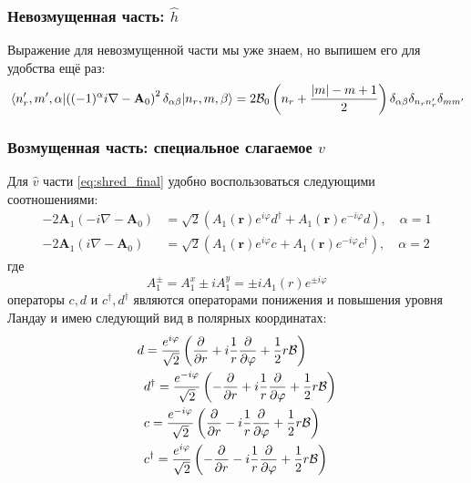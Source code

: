 \documentclass[a4paper,article,14pt]{extarticle}
\begin{document}
\subsubsection{Невозмущенная часть: $\hat h$}
Выражение для невозмущенной части мы уже знаем, но выпишем его для удобства ещё раз:
\begin{equation}
\mel{n'_r, m', \alpha} {\left((-1)^\alpha i \nabla - \mathbf{A}_0 \right) ^ 2 \delta_{\alpha \beta}} {n_r, m, \beta} = 
2 {\cal B}_{0} \left( n_r + \frac{|m| - m + 1}{2} \right) \delta_{\alpha \beta} \delta_{n_r n'_r} \delta_{m m'} 
\end{equation}


\subsubsection{Возмущенная часть: специальное слагаемое $\hat v$}
Для  $\hat v$ части \eqref{eq:shred_final} удобно воспользоваться следующими соотношениями:
\begin{equation}
\begin{aligned}
-2 \mathbf{A}_1  (-i \nabla - \mathbf{A}_0 )& = \sqrt{2} \left( A_{1} (\mathbf{r}) e^{ i \varphi  } d^{\dagger} +  A_{1} (\mathbf{r}) e^{-i \varphi  } d \right), \quad \alpha = 1 \\
-2 \mathbf{A}_1  (i \nabla - \mathbf{A}_0 ) & = \sqrt{2} \left( A_{1} (\mathbf{r}) e^{  i \varphi  } c^{} +  A_{1} (\mathbf{r}) e^{-i \varphi  } c^{\dagger} \right) , \quad \alpha = 2
\end{aligned}
\end{equation}
где 
$$
A^{\pm}_{1}   = A_{1}^{x} \pm i A_{1}^{y} = \pm i A_1 (r) e^{ \pm i \varphi  } 
$$
операторы $c,d$ и $c^{\dagger},d^{\dagger} $ являются операторами понижения и повышения уровня Ландау и имею следующий вид в полярных координатах:
\begin{equation}
\begin{aligned}
d &= \frac{e^{i \varphi}} {\sqrt{2}} \left(  \frac {\partial }{\partial r} + i \frac{1}{r}  \frac {\partial }{\partial \varphi} + \frac 1 2   r \cal B  \right) \\
&d^{\dagger} = \frac{e^{ -i \varphi}} {\sqrt{2}} \left(  - \frac {\partial }{\partial r} + i \frac{1}{r}  \frac {\partial }{\partial \varphi} + \frac 1 2    r \cal B \right) \\
&c = \frac{e^{- i \varphi}} {\sqrt{2}} \left(  \frac {\partial }{\partial r} - i \frac{1}{r}  \frac {\partial }{\partial \varphi} + \frac 1 2   r \cal B  \right) \\
&c^{\dagger} = \frac{e^{ i \varphi}} {\sqrt{2}} \left(  - \frac {\partial }{\partial r} - i \frac{1}{r}  \frac {\partial }{\partial \varphi} + \frac 1 2    r \cal B \right) \\
\end{aligned}
\end{equation}
\end{document}
